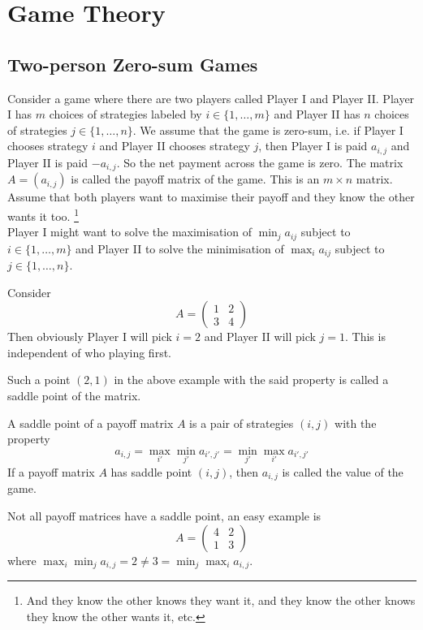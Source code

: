 \section{Game Theory}
\subsection{Two-person Zero-sum Games}
Consider a game where there are two players called Player I and Player II.
Player I has $m$ choices of strategies labeled by $i\in\{1,\ldots,m\}$ and Player II has $n$ choices of strategies $j\in\{1,\ldots,n\}$.
We assume that the game is zero-sum, i.e. if Player I chooses strategy $i$ and Player II chooses strategy $j$, then Player I is paid $a_{i,j}$ and Player II is paid $-a_{i,j}$.
So the net payment across the game is zero.
The matrix $A=(a_{i,j})$ is called the payoff matrix of the game.
This is an $m\times n$ matrix.
Assume that both players want to maximise their payoff and they know the other wants it too.
\footnote{And they know the other knows they want it, and they know the other knows they know the other wants it, etc.}\\
Player I might want to solve the maximisation of $\min_ja_{ij}$ subject to $i\in\{1,\ldots,m\}$ and Player II to solve the minimisation of $\max_ia_{ij}$ subject to $j\in\{1,\ldots,n\}$.
\begin{example}
    Consider
    $$A=\begin{pmatrix}
        1&2\\
        3&4
    \end{pmatrix}$$
    Then obviously Player I will pick $i=2$ and Player II will pick $j=1$.
    This is independent of who playing first.
\end{example}
Such a point $(2,1)$ in the above example with the said property is called a saddle point of the matrix.
\begin{definition}
    A saddle point of a payoff matrix $A$ is a pair of strategies $(i,j)$ with the property
    $$a_{i,j}=\max_{i'}\min_{j'}a_{i',j'}=\min_{j'}\max_{i'}a_{i',j'}$$
    If a payoff matrix $A$ has saddle point $(i,j)$, then $a_{i,j}$ is called the value of the game.
\end{definition}
Not all payoff matrices have a saddle point, an easy example is
$$A=\begin{pmatrix}
    4&2\\
    1&3
\end{pmatrix}$$
where $\max_i\min_ja_{i,j}=2\neq 3=\min_j\max_ia_{i,j}$.
